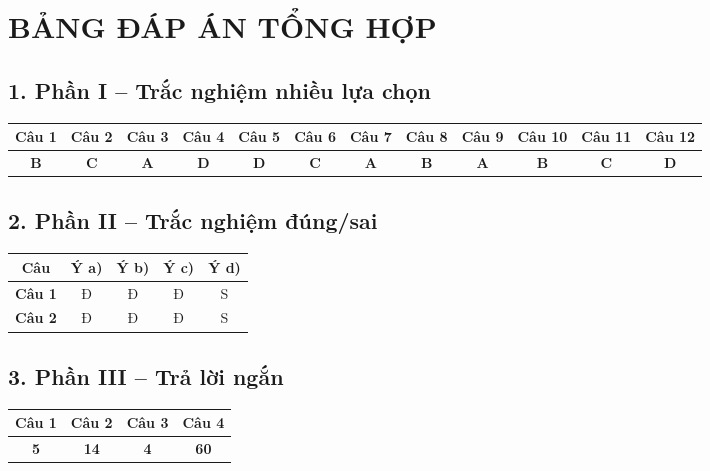 \documentclass[12pt,a4paper]{article}
\begin{document}
\newpage
\section*{BẢNG ĐÁP ÁN TỔNG HỢP}

\subsection*{1. Phần I -- Trắc nghiệm nhiều lựa chọn}
\begin{center}
\setlength{\tabcolsep}{2.0pt}
\begin{tabular}{|c|c|c|c|c|c|c|c|c|c|c|c|}
\hline
\textbf{Câu 1} & \textbf{Câu 2} & \textbf{Câu 3} & \textbf{Câu 4} & \textbf{Câu 5} & \textbf{Câu 6} & \textbf{Câu 7} & \textbf{Câu 8} & \textbf{Câu 9} & \textbf{Câu 10} & \textbf{Câu 11} & \textbf{Câu 12} \\
\hline
\textbf{B} & \textbf{C} & \textbf{A} & \textbf{D} & \textbf{D} & \textbf{C} & \textbf{A} & \textbf{B} & \textbf{A} & \textbf{B} & \textbf{C} & \textbf{D} \\
\hline
\end{tabular}
\end{center}

\subsection*{2. Phần II -- Trắc nghiệm đúng/sai}
\begin{center}
\begin{tabular}{|c|c|c|c|c|}
\hline
\textbf{Câu} & \textbf{Ý a)} & \textbf{Ý b)} & \textbf{Ý c)} & \textbf{Ý d)} \\
\hline
\textbf{Câu 1} & Đ & Đ & Đ & S \\
\hline
\textbf{Câu 2} & Đ & Đ & Đ & S \\
\hline
\end{tabular}
\end{center}

\subsection*{3. Phần III -- Trả lời ngắn}
\begin{center}
\begin{tabular}{|c|c|c|c|}
\hline
\textbf{Câu 1} & \textbf{Câu 2} & \textbf{Câu 3} & \textbf{Câu 4} \\
\hline
\textbf{5} & \textbf{14} & \textbf{4} & \textbf{60} \\
\hline
\end{tabular}
\end{center}
\end{document}

